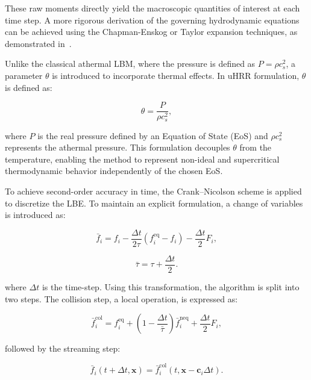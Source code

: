 These raw moments directly yield the macroscopic quantities of interest at each time step. A more rigorous derivation of the governing hydrodynamic equations can be achieved using the Chapman-Enskog or Taylor expansion techniques, as demonstrated in~\cite{kruger2017lattice}.

Unlike the classical athermal LBM, where the pressure is defined as \( P = \rho c_s^2 \), a parameter \( \theta \) is introduced to incorporate thermal effects. In uHRR formulation, \( \theta \) is defined as:

\begin{equation}
    \theta = \frac{P}{\rho c_s^2},
\end{equation}

where \( P \) is the real pressure defined by an Equation of State (EoS) and \( \rho c_s^2 \) represents the athermal pressure. This formulation decouples \( \theta \) from the temperature, enabling the method to represent non-ideal and supercritical thermodynamic behavior independently of the chosen EoS.



To achieve second-order accuracy in time, the Crank--Nicolson scheme is applied to discretize the LBE. To maintain an explicit formulation, a change of variables is introduced as:

\begin{equation}
    \bar{f}_i = f_i - \frac{\Delta t}{2\tau}(f_i^{\mathrm{eq}} - f_i) - \frac{\Delta t}{2} F_i,
\end{equation}

\begin{equation}
    \bar{\tau} = \tau + \frac{\Delta t}{2}.
\end{equation}

where $\Delta t$ is the time-step. Using this transformation, the algorithm is split into two steps. The collision step, a local operation, is expressed as:

\begin{equation}
    \bar{f}_i^{\mathrm{col}} = f_i^{\mathrm{eq}} + \left(1 - \frac{\Delta t}{\bar{\tau}}\right) \bar{f}_i^{\mathrm{neq}} + \frac{\Delta t}{2} F_i,
\end{equation}

followed by the streaming step:

\begin{equation}
    \bar{f}_i(t + \Delta t, \mathbf{x}) = \bar{f}_i^{\mathrm{col}}(t, \mathbf{x} - \mathbf{c}_i \Delta t).
\end{equation}

